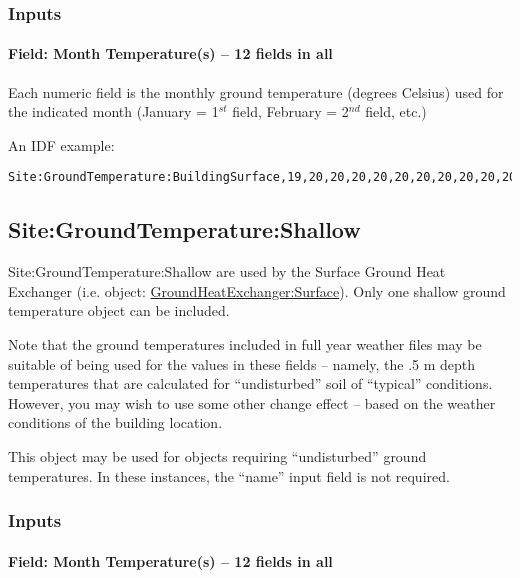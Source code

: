 \subsubsection{Inputs}\label{inputs-11-008}

\paragraph{Field: Month Temperature(s) -- 12 fields in all}\label{field-month-temperatures-12-fields-in-all}

Each numeric field is the monthly ground temperature (degrees Celsius) used for the indicated month (January = 1\(^{st}\) field, February = 2\(^{nd}\) field, etc.)

An IDF example:

\begin{lstlisting}
Site:GroundTemperature:BuildingSurface,19,20,20,20,20,20,20,20,20,20,20,20;
\end{lstlisting}

\subsection{Site:GroundTemperature:Shallow}\label{sitegroundtemperatureshallow}

Site:GroundTemperature:Shallow are used by the Surface Ground Heat Exchanger (i.e. object: \hyperref[groundheatexchangersurface]{GroundHeatExchanger:Surface}). Only one shallow ground temperature object can be included.

\begin{callout}
Note that the ground temperatures included in full year weather files may be suitable of being used for the values in these fields -- namely, the .5 m depth temperatures that are calculated for ``undisturbed'' soil of ``typical'' conditions. However, you may wish to use some other change effect -- based on the weather conditions of the building location.
\end{callout}

This object may be used for objects requiring ``undisturbed'' ground temperatures. In these instances, the ``name'' input field is not required.

\subsubsection{Inputs}\label{inputs-12-008}

\paragraph{Field: Month Temperature(s) -- 12 fields in all}\label{field-month-temperatures-12-fields-in-all-1}


